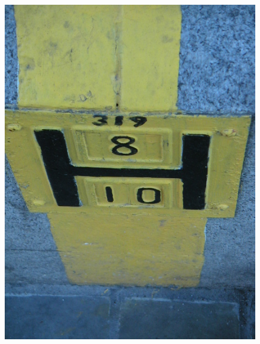 \begin{figure}[h!]
    	\includegraphics[height=0.18\textheight]{related_work/figs/icdar13_img_2.jpg}
    
    	\vspace{1.5mm}
    	

\end{figure}
